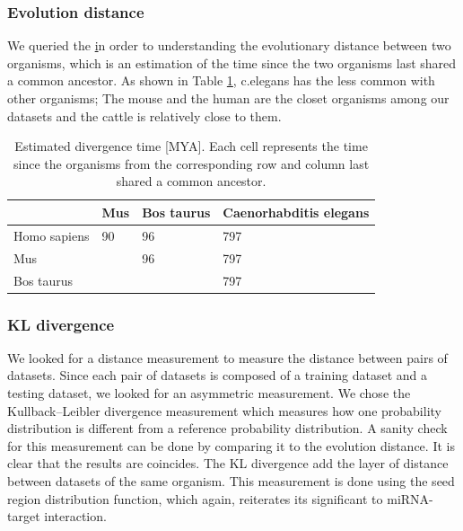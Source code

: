\documentclass{bmcart}
\begin{document}
\subsubsection*{Evolution distance}
We queried the \href{http://www.timetree.org} in order to understanding the evolutionary distance between two organisms, which is an estimation of the time since the two organisms last shared a common ancestor. As shown in Table \ref{tab:evolutiontime}, c.elegans has the less common with other organisms; The mouse and the human are the closet organisms among our datasets and the cattle is relatively close to them. 

\begin{table}[h!]
\caption{Estimated divergence time {[}MYA{]}. Each cell represents the time since the organisms from the corresponding row and column last shared a common ancestor.}
\label{tab:evolutiontime}
\begin{tabular}{|l|l|l|l|}
\hline
             & Mus & Bos taurus & Caenorhabditis elegans \\ \hline
Homo sapiens & 90  & 96         & 797                    \\ \hline
Mus          &     & 96         & 797                    \\ \hline
Bos taurus   &     &            & 797                    \\ \hline
\end{tabular}
\end{table}

\subsubsection*{KL divergence}
We looked for a distance measurement to measure the distance between pairs of datasets. Since each pair of datasets is composed of a training dataset and a testing dataset, we looked for an asymmetric measurement. We chose the Kullback–Leibler divergence measurement which measures how one probability distribution is different from a reference probability distribution. A sanity check for this measurement can be done by comparing it to the evolution distance. It is clear that the results are coincides. The KL divergence add the layer of distance between datasets of the same organism.
This measurement is done using the seed region distribution function, which again, reiterates its significant to miRNA-target interaction.
\end{document}
